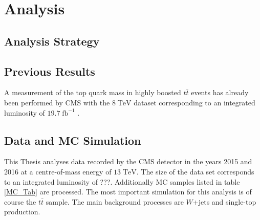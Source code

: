 \chapter{Analysis}

\section{Analysis Strategy}

\section{Previous Results}
	A measurement of the top quark mass in highly boosted $t\bar{t}$ events has already been performed by CMS with the $8\;\text{TeV}$ dataset corresponding to an integrated luminosity of $19.7\;\text{fb}^{-1}$ \cite{torben_paper}.
\section{Data and MC Simulation}
	This Thesis analyses data recorded by the CMS detector in the years 2015 and 2016 at a centre-of-mass energy of $13\;\text{TeV}$. The size of the data set corresponds to an integrated luminosity of ???. Additionally MC samples listed in table \ref{MC_Tab} are processed. The most important simulation for this analysis is of course the $t\bar{t}$ sample. The main background processes are $W$+jets and single-top production.
	
